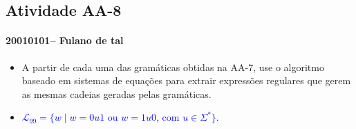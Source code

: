 \documentclass[12pt]{article}
\def\discente{Fulano de tal}
\def\matricula{20010101}
\def\aa{8}
\def\myling{{99}} %
\begin{document}
\subsection*{Atividade AA-\aa}
 \paragraph{\matricula -- \discente}
%
%
 \begin{itemize}
  \item A partir de cada uma das gramáticas obtidas na AA-7, use o algoritmo baseado em sistemas de equações para extrair expressões regulares que gerem as mesmas cadeias geradas pelas gramáticas.
  \item \textcolor{blue}{$\mathcal{L}_\myling = \{w\mid w=0u1$ ou $w=1u0$, com $u\in\Sigma^*\}$.}
  

\end{itemize}
\end{document}
